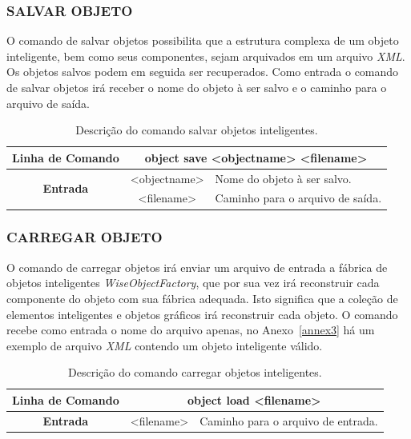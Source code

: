 \documentclass[a4paper,12pt]{monografia}
\theoremstyle{plain}
\theoremstyle{definition}
\theoremstyle{remark}
\begin{document}
\subsubsection{SALVAR OBJETO}\label{sec:save_object}

O comando de salvar objetos possibilita que a estrutura complexa de um objeto inteligente, bem como seus componentes, sejam arquivados em um arquivo \textit{XML}. Os objetos salvos podem em seguida ser recuperados. Como entrada o comando de salvar objetos irá receber o nome do objeto à ser salvo e o caminho para o arquivo de saída.

\begin{center}
	\begin{table}[!htbp]
		\begin{tabular}{|c|c|m{}|}
			\hline
			\textbf{Linha de Comando} & \multicolumn{2}{c|}{object save <object\underline{\space\space}name> <filename>} \\
			\hline
			\multirow{2}{*}{\textbf{Entrada}} & <object\underline{\space\space}name> & Nome do objeto à ser salvo. \\
			& <filename> & Caminho para o arquivo de saída. \\
			\hline
		\end{tabular}
		\caption{Descrição do comando salvar objetos inteligentes.}
		\label{tab:save_object}
	\end{table}
\end{center}


\subsubsection{CARREGAR OBJETO}\label{sec:load_object}

O comando de carregar objetos irá enviar um arquivo de entrada a fábrica de objetos inteligentes \textit{WiseObjectFactory}, que por sua vez irá reconstruir cada componente do objeto com sua fábrica adequada. Isto significa que a coleção de elementos inteligentes e objetos gráficos irá reconstruir cada objeto. O comando recebe como entrada o nome do arquivo apenas, no Anexo~\ref{annex3} há um exemplo de arquivo \textit{XML} contendo um objeto inteligente válido.

\begin{center}
	\begin{table}[!htbp]
		\begin{tabular}{|c|c|m{}|}
			\hline
			\textbf{Linha de Comando} & \multicolumn{2}{c|}{object load <filename>} \\
			\hline
			\textbf{Entrada} &  <filename> & Caminho para o arquivo de entrada. \\
			\hline
		\end{tabular}
		\caption{Descrição do comando carregar objetos inteligentes.}
		\label{tab:load_object}
	\end{table}
\end{center}
\end{document}

